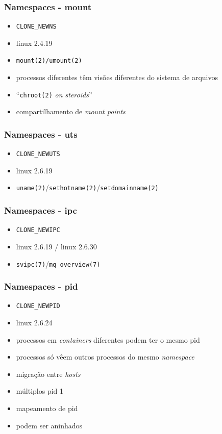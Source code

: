 \documentclass{beamer}
\begin{document}
\begin{frame}
    \frametitle{Namespaces - mount}
    \begin{itemize}
        \item \texttt{CLONE\_NEWNS}
        \item linux 2.4.19
        \item \texttt{mount(2)/umount(2)}
        \item processos diferentes têm visões diferentes do sistema de arquivos
        \item ``\texttt{chroot(2)} \textit{on steroids}''
        \item compartilhamento de \textit{mount points}
    \end{itemize}
\end{frame}

\begin{frame}
    \frametitle{Namespaces - uts}
    \begin{itemize}
        \item \texttt{CLONE\_NEWUTS}
        \item linux 2.6.19
        \item \texttt{uname(2)}/\texttt{sethotname(2)}/\texttt{setdomainname(2)}
    \end{itemize}
\end{frame}

\begin{frame}
    \frametitle{Namespaces - ipc}
    \begin{itemize}
        \item \texttt{CLONE\_NEWIPC}
        \item linux 2.6.19 / linux 2.6.30
        \item \texttt{svipc(7)}/\texttt{mq\_overview(7)}
    \end{itemize}
\end{frame}

\begin{frame}
    \frametitle{Namespaces - pid}
    \begin{itemize}
        \item \texttt{CLONE\_NEWPID}
        \item linux 2.6.24
        \item processos em \textit{containers} diferentes podem ter o mesmo pid
        \item processos só vêem outros processos do mesmo \textit{namespace}
        \item migração entre \textit{hosts}
        \item múltiplos pid 1
        \item mapeamento de pid
        \item podem ser aninhados
    \end{itemize}
\end{frame}
\end{document}
